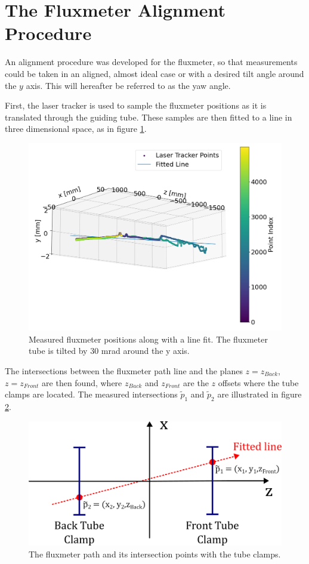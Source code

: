 \section{The Fluxmeter Alignment Procedure}
An alignment procedure was developed for the fluxmeter, so that
measurements could be taken in an aligned, almost ideal case
or with a desired tilt angle around the $y$ axis. This will 
hereafter be referred to as the yaw angle. 

First, the laser tracker is used to sample the fluxmeter positions
as it is translated through the guiding tube. These samples are then fitted to
a line in three dimensional space, as in figure \ref{fig:geomfit}.

\begin{figure}[!h]
    \centering
    \includegraphics[width=0.8\linewidth]{figs/geomfit}
    \caption{Measured fluxmeter positions along with a line
    fit. The fluxmeter tube is tilted by $30$ mrad around the y axis.}
    \label{fig:geomfit}
\end{figure}

The intersections between the fluxmeter path line and the 
planes $z = z_{Back}$, $z = z_{Front}$ are then found, where
$z_{Back}$ and $z_{Front}$ are the $z$ offsets where the tube clamps
are located. The measured intersections $\tilde{p}_1$ and $\tilde{p}_2$
are illustrated in figure \ref{fig:alignment}.

\begin{figure}[!h]
    \centering
    \includegraphics[width=0.8\linewidth]{figs/alignment}
    \caption{The fluxmeter path and its intersection points with
    the tube clamps.}
    \label{fig:alignment}
\end{figure}

